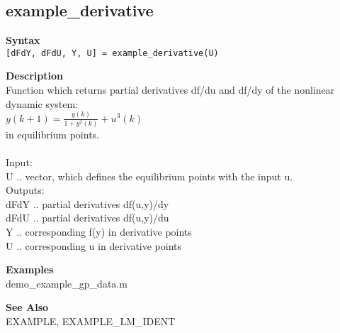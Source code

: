 \subsection*{example\_derivative} \label{fun:example_derivative}

\textbf{Syntax}
\\  \texttt{{[}dFdY, dFdU, Y, U{]} = example\_derivative(U)}


\textbf{Description}
\\ Function which returns partial derivatives df/du and df/dy of the
nonlinear dynamic system:
\\   $ y(k+1) = \frac{y(k)}{1+y^2(k)} + u^3(k) $
\\ in equilibrium points.
\\
\\ Input:
\\ U .. vector, which defines the equilibrium points with the input u.
\\ Outputs:
\\ dFdY .. partial derivatives df(u,y)/dy
\\ dFdU .. partial derivatives df(u,y)/du
\\ Y .. corresponding f(y) in derivative points
\\ U .. corresponding u in derivative points

\textbf{Examples}
\\ demo\_example\_gp\_data.m

\textbf{See Also}
\\ EXAMPLE, EXAMPLE\_LM\_IDENT
